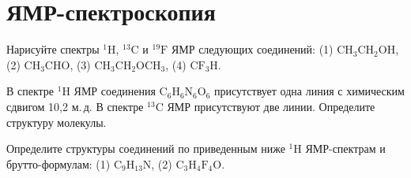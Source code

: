 \setmainfont{Noto Serif}
\setsansfont{Noto Sans}
\setmonofont{Noto Sans Mono}

\section{ЯМР-спектроскопия}
 Нарисуйте спектры $^1\text{H}$, $^{13}\text{C}$ и $^{19}\text{F}$ ЯМР следующих соединений: (1) $\text{CH}_3\text{CH}_2\text{OH}$, (2) $\text{CH}_3\text{CH}\text{O}$, (3) $\text{CH}_3\text{CH}_2\text{O}\text{CH}_3$, (4) $\text{CF}_3\text{H}$.
\par
{} В спектре $^1\text{H}$ ЯМР соединения $\text{C}_{6}\text{H}_{6}\text{N}_{6}\text{O}_{6}$ присутствует одна линия с химическим сдвигом 10,2 м.\,д. В спектре $^{13}\text{C}$ ЯМР присутствуют две линии. Определите структуру молекулы.
\par
{} Определите структуры соединений по приведенным ниже $^1\text{H}$ ЯМР-спектрам и брутто-формулам: (1) $\text{C}_{9}\text{H}_{13}\text{N}$, (2) $\text{C}_{3}\text{H}_{4}\text{F}_4\text{O}$.

